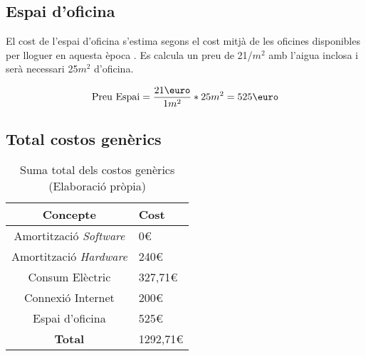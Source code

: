 \subsection{Espai d'oficina}
El cost de l'espai d'oficina s'estima segons el cost mitjà de les oficines disponibles per lloguer en aquesta època \cite{preu-oficina}. Es calcula un preu de 21\text{\euro}/$m^2$ amb l'aigua inclosa i serà necessari 25$m^2$ d'oficina.

$$
\text{Preu Espai} = \frac{21 \text{\euro}}{1 m^2} * 25 m^2 = 525\text{\euro}
$$

\subsection{Total costos genèrics}


\begin{table}[H]
    \centering
    \begin{tabular}{c|l}
        \textbf{Concepte}     & \textbf{Cost} \\
        \hline
        Amortització \textit{Software} & 0\euro         \\
        Amortització \textit{Hardware} & 240\euro       \\
        Consum Elèctric                & 327,71\euro    \\
        Connexió Internet              & 200\euro       \\
        Espai d'oficina                & 525\euro       \\
        \hline
        \textbf{Total}                 & 1292,71\euro   \\
    \end{tabular}
    \caption[Costos genèrics]{Suma total dels costos genèrics \\ (Elaboració pròpia)}
    \label{tab:costos_generics}
\end{table}
